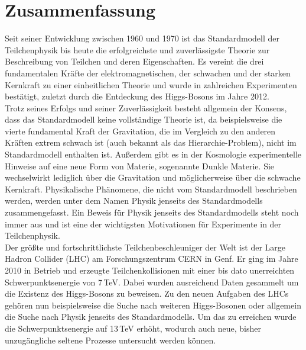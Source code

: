\chapter*{Zusammenfassung}
Seit seiner Entwicklung zwischen 1960 und 1970 ist das Standardmodell der Teilchenphysik bis heute die erfolgreichste und zuverlässigste Theorie zur Beschreibung von Teilchen und deren Eigenschaften. Es vereint die drei fundamentalen Kräfte der elektromagnetischen, der schwachen und der starken Kernkraft zu einer einheitlichen Theorie und wurde in zahlreichen Experimenten bestätigt, zuletzt durch die Entdeckung des Higgs-Bosons im Jahre 2012.\\

Trotz seines Erfolgs und seiner Zuverl\"assigkeit besteht allgemein der Konsens, dass das Standardmodell keine vollständige Theorie ist, da beispielsweise die vierte fundamental Kraft der Gravitation, die im Vergleich zu den anderen Kräften extrem schwach ist (auch bekannt als das Hierarchie-Problem), nicht im Standardmodell enthalten ist. Außerdem gibt es in der Kosmologie experimentelle Hinweise auf eine neue Form von Materie, sogenannte Dunkle Materie. Sie wechselwirkt lediglich über die Gravitation und möglicherweise über die schwache Kernkraft. Physikalische Phänomene, die nicht vom Standardmodell beschrieben werden, werden unter dem Namen Physik jenseits des Standardmodells zusammengefasst. Ein Beweis für Physik jenseits des Standardmodells steht noch immer aus und ist eine der wichtigsten Motivationen für Experimente in der Teilchenphysik.\\

Der größte und fortschrittlichste Teilchenbeschleuniger der Welt ist der Large Hadron Collider (LHC) am Forschungszentrum CERN in Genf. Er ging im Jahre 2010 in Betrieb und erzeugte Teilchenkollisionen mit einer bis dato unerreichten Schwerpunktsenergie von 7\,TeV. Dabei wurden ausreichend Daten gesammelt um die Existenz des Higgs-Bosons zu beweisen. Zu den neuen Aufgaben des LHCs gehören nun beispielsweise die Suche nach weiteren Higgs-Bosonen oder allgemein die Suche nach Physik jenseits des Standardmodells. Um das zu erreichen wurde die Schwerpunktsenergie auf 13\,TeV erhöht, wodurch auch neue, bisher unzugängliche seltene Prozesse untersucht werden können.\\

